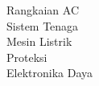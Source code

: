 \documentclass[preview]{standalone}
\begin{document}
Rangkaian AC\\Sistem Tenaga\\Mesin Listrik\\Proteksi\\Elektronika Daya\\
\end{document}

